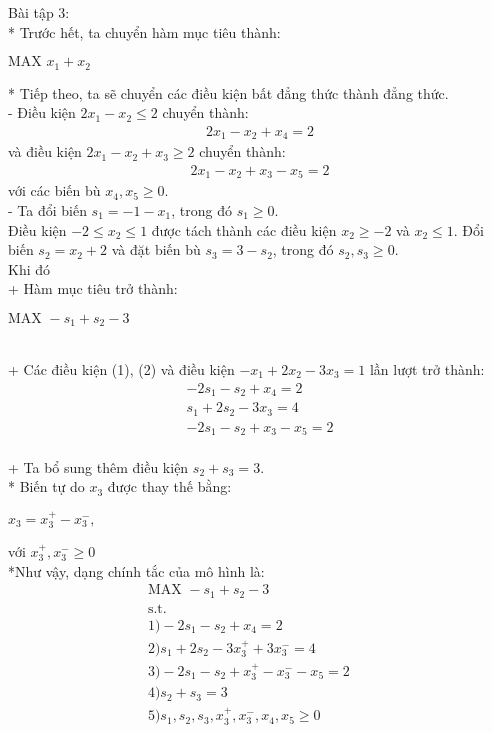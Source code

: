 Bài tập 3: 
\\
* Trước hết, ta chuyển hàm mục tiêu thành:
\begin{center}
    $\text{MAX  } x_1 + x_2 $
\end{center}
* Tiếp theo, ta sẽ chuyển các điều kiện bất đẳng thức thành đẳng thức.
\\
- Điều kiện $2x_1 - x_2 \leq 2$ chuyển thành:
\begin{align}
    2x_1 - x_2 + x_4 = 2
\end{align}
và điều kiện $2x_1 - x_2 + x_3 \geq 2$ chuyển thành:
\begin{align}
    2x_1 - x_2 + x_3 -x_5 = 2
\end{align}
với các biến bù $x_4, x_5 \geq 0$.
\\
- Ta đổi biến $s_1 = -1 - x_1$, trong đó $s_1 \geq 0$.
\\
Điều kiện $-2 \leq x_2 \leq 1$ được tách thành các điều kiện $x_2 \geq -2$ và $x_2 \leq 1$. Đổi biến $s_2 = x_2 + 2$ và đặt biến bù $s_3 = 3 - s_2$, trong đó $s_2, s_3 \geq 0$.
\\
Khi đó
\\
+ Hàm mục tiêu trở thành:
\begin{center}
    $\text{MAX  } -s_1 + s_2 -3$
\end{center}
\\
+ Các điều kiện (1), (2) và điều kiện $-x_1 + 2x_2 - 3x_3 = 1$ lần lượt trở thành:
\begin{align*}
    -2s_1 - s_2 + x_4 = 2 \\
    s_1 + 2s_2 - 3x_3 = 4 \\
    -2s_1 - s_2 + x_3 -x_5 = 2 
\end{align*}
\\
+ Ta bổ sung thêm điều kiện $s_2 + s_3 = 3$.
\\
* Biến tự do $x_3$ được thay thế bằng:
\begin{center}
    $x_3 = x_{3}^{+} - x_{3}^{-},$
\end{center}
với $x_{3}^{+}, x_{3}^{-} \geq 0$
\\
*Như vậy, dạng chính tắc của mô hình là:
\begin{align*}
    \text{MAX  } -s_1 + s_2 - 3 &&
    \\
    \text{s.t.} &&
    \\
    1) -2s_1 - s_2 + x_4 = 2 &&
    \\
    2) s_1 + 2s_2 - 3x_{3}^{+} + 3x_{3}^{-} = 4 &&
    \\
    3) -2s_1 - s_2 + x_{3}^{+} - x_{3}^{-} - x_5 = 2 &&
    \\
    4) s_2 + s_3 = 3 &&
    \\
    5) s_1, s_2, s_3, x_{3}^{+}, x_{3}^{-}, x_4, x_5 \geq 0
    \\
\end{align*}
